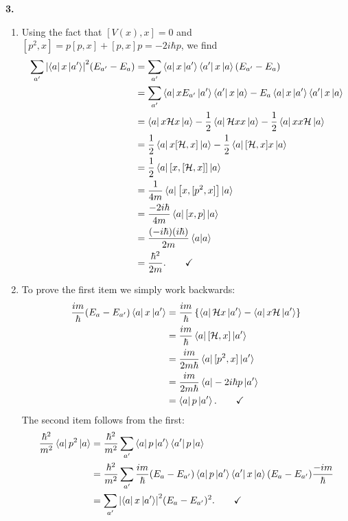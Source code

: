 \documentclass{article}
\theoremstyle{definition}
\newcommand{\ham}{\mathcal{H}}
\newcommand{\f}[2]{\frac{#1}{#2}}
\newcommand{\lb}{\left[}
\newcommand{\rb}{\right]}
\newcommand{\lc}{\left\{}
\newcommand{\rc}{\right\}}
\begin{document}
\noindent \textbf{3. }

\begin{enumerate}[label=(\alph*)]
	\item Using the fact that $[V(x),x]= 0$ and $[p^2,x] = p[p,x] + [p,x]p = -2i\hbar p$, we find
	\begin{align*}
	\sum_{a'}\abs{\bra{a}x\ket{a'}}^2 (E_{a'} - E_a) 
	&= \sum_{a'}\bra{a}x \ket{a'}\bra{a'}x \ket{a} (E_{a'} - E_a) \\
	&= \sum_{a'}\bra{a}x E_{a'} \ket{a'}\bra{a'}x \ket{a} - E_a \bra{a}x \ket{a'}\bra{a'}x \ket{a}\\
	&= \bra{a} x\ham x\ket{a} - \f{1}{2}\bra{a} \ham x x \ket{a} - \f{1}{2}\bra{a} x x \ham \ket{a}\\
	&= \f{1}{2}\bra{a} x[\ham,x ] \ket{a} - \f{1}{2}\bra{a} [\ham,x]x \ket{a}\\
	&= \f{1}{2}\bra{a} \lb x, [\ham,x] \rb \ket{a}\\
	&= \f{1}{4m}\bra{a} \lb x, [p^2,x] \rb \ket{a}\\
	&= \f{-2i\hbar}{4m} \bra{a} [x,p] \ket{a}\\
	&= \f{(-i\hbar)(i\hbar)}{2m}\braket{a} \\
	&= \f{\hbar^2}{2m}. \quad\quad \checkmark
	\end{align*}
	
	\item To prove the first item we simply work backwards:
	\begin{align*}
	\f{im}{\hbar} (E_{a}-E_{a'}) \bra{a}x \ket{a'} 
	&= \f{im}{\hbar} \lc \bra{a} \ham x \ket{a'} - \bra{a} x\ham \ket{a'} \rc\\
	&= \f{im}{\hbar}\bra{a} [\ham, x]\ket{a'}\\
	&= \f{im}{2m\hbar}\bra{a} [p^2, x]\ket{a'}\\
	&= \f{im}{2m\hbar}\bra{a} -2i\hbar p \ket{a'}\\
	&= \bra{a} p \ket{a'}. \quad\quad \checkmark
	\end{align*}
	The second item follows from the first:
	\begin{align*}
	\f{\hbar^2}{m^2}\bra{a}p^2\ket{a} 
	&= \f{\hbar^2}{m^2}\sum_{a'} \bra{a}p\ket{a'}\bra{a'}p\ket{a} \\
	&= \f{\hbar^2}{m^2}\sum_{a'} \f{im}{\hbar} (E_a - E_{a'})\bra{a}p\ket{a'}\bra{a'} x \ket{a} (E_{a}- E_{a'})\f{-im}{\hbar} \\
	&= \sum_{a'} \abs{\bra{a}x \ket{a'}}^2 (E_a - E_{a'})^2. \quad\quad\checkmark
	\end{align*}
	

\end{enumerate}
\end{document}
